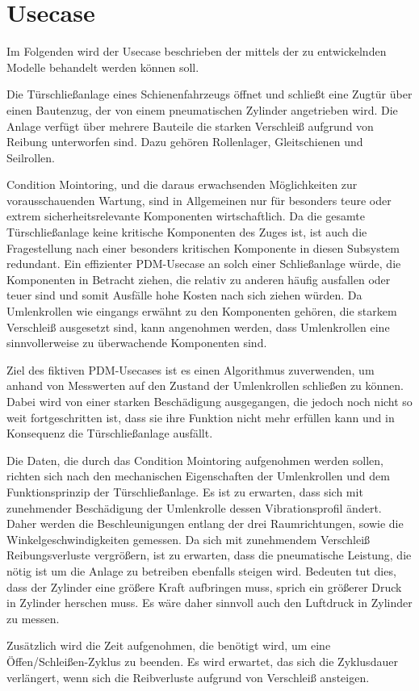 \chapter{Usecase}
\label{ch:usecase}

Im Folgenden wird der Usecase beschrieben der mittels der zu entwickelnden Modelle behandelt werden können soll.

Die Türschließanlage eines Schienenfahrzeugs öffnet und schließt eine Zugtür über einen Bautenzug, der von einem pneumatischen Zylinder angetrieben wird. Die Anlage verfügt über mehrere Bauteile die starken Verschleiß aufgrund von Reibung unterworfen sind. Dazu gehören Rollenlager, Gleitschienen und Seilrollen. 

Condition Mointoring, und die daraus erwachsenden Möglichkeiten zur vorausschauenden Wartung, sind in Allgemeinen nur für besonders teure oder extrem sicherheitsrelevante Komponenten wirtschaftlich. Da die gesamte Türschließanlage keine kritische Komponenten des Zuges ist, ist auch die Fragestellung nach einer besonders kritischen Komponente in diesen Subsystem redundant. Ein effizienter PDM-Usecase an solch einer Schließanlage würde, die Komponenten in Betracht ziehen, die relativ zu anderen häufig ausfallen oder teuer sind und somit Ausfälle hohe Kosten nach sich ziehen würden. Da Umlenkrollen wie eingangs erwähnt zu den Komponenten gehören, die starkem Verschleiß ausgesetzt sind, kann angenohmen werden, dass Umlenkrollen eine sinnvollerweise zu überwachende Komponenten sind. 

Ziel des fiktiven PDM-Usecases ist es einen Algorithmus zuverwenden, um anhand von Messwerten auf den Zustand der Umlenkrollen schließen zu können. Dabei wird von einer starken Beschädigung ausgegangen, die jedoch noch nicht so weit fortgeschritten ist, dass sie ihre Funktion nicht mehr erfüllen kann und in Konsequenz die Türschließanlage ausfällt. 

Die Daten, die durch das Condition Mointoring aufgenohmen werden sollen, richten sich nach den mechanischen Eigenschaften der Umlenkrollen und dem Funktionsprinzip der Türschließanlage. Es ist zu erwarten, dass sich mit zunehmender Beschädigung der Umlenkrolle dessen Vibrationsprofil ändert. Daher werden die Beschleunigungen entlang der drei Raumrichtungen, sowie die Winkelgeschwindigkeiten gemessen. 
Da sich mit zunehmendem Verschleiß Reibungsverluste vergrößern, ist zu erwarten, dass die pneumatische Leistung, die nötig ist um die Anlage zu betreiben ebenfalls steigen wird. Bedeuten tut dies, dass der Zylinder eine größere Kraft aufbringen muss, sprich ein größerer Druck in Zylinder herschen muss. Es wäre daher sinnvoll auch den Luftdruck in Zylinder zu messen.

Zusätzlich wird die Zeit aufgenohmen, die benötigt wird, um eine Öffen/Schleißen-Zyklus zu beenden. Es wird erwartet, das sich die Zyklusdauer verlängert, wenn sich die Reibverluste aufgrund von Verschleiß ansteigen.